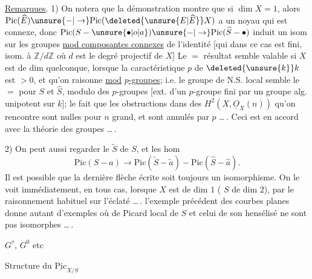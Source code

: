 \uline{Remarques}. 1) On notera que la démonstration
montre que si $\dim X=1$, alors $\mathrm{Pic}(\widehat E)\unsure{-|\to}\mathrm{Pic}(\deleted{\unsure{E|\widehat E}}X)$
a un noyau qui est connexe,  donc
$\mathrm{Pic}(S-\unsure{\bullet|o|a})\unsure{-|\to}\mathrm{Pic}(\widehat S-\bullet)$ induit un isom sur les
groupes \uline{mod composantes connexes} de l'identité
[qui dans ce cas est fini, isom. à $\mathbb Z/d\mathbb Z$ où
$d$ est le degré projectif de $X$] Le $=$ résultat
semble valable si $X$ est de dim quelconque,
lorsque  la caractéristique 
$p$ de $\deleted{\unsure{k}}k$ est $>0$, et qu'on raisonne
\uline{mod} \uline{$p$-groupes}; i.e. le groupe de N.S. local
semble le $=$ pour $S$ et $\widehat S$, modulo des
$p$-groupes [ext. d'un $p$-groupe fini par un
groupe alg. unipotent sur $k$];  le
fait que les obstructions dans des
$H^2(X,\underline O_X(n))$ qu'on rencontre sont nulles
pour $n$ grand, et sont annulés par $p$ \ldots\,. 
Ceci est en accord avec la théorie des
groupes  \ldots\,. 

2) On peut aussi regarder le 
$\widetilde S$ de $S$, et les hom
\[
\mathrm{Pic}(S-a)\longrightarrow\mathrm{Pic}(\widetilde S-\widetilde a)-\mathrm{Pic}(\widehat S-\widehat a).
\]
Il est possible que la dernière flèche
écrite soit toujours un isomorphisme.
On le voit immédiatement, en tous cas,
lorsque $X$ est de dim $1$ ( $S$ de
dim $2$), par le raisonnement habituel
sur l'éclaté \ldots\,.  l'exemple précédent
des courbes planes donne autant
d'exemples où   de Picard local de
$S$ et celui de son hensélisé ne sont
pas isomorphes \ldots\,.

$G^\tau$, $G^0$ etc

Structure  du $\underline{\mathrm{Pic}}_{X/S}$



